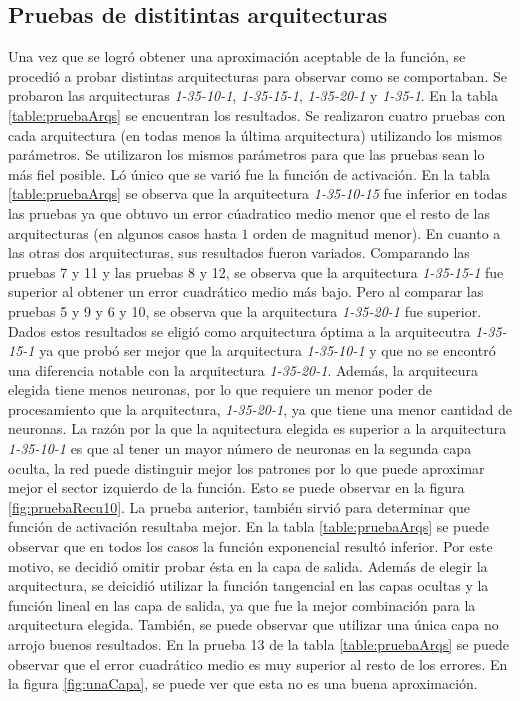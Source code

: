 \documentclass[11pt,a4paper]{article}
\begin{document}
\subsection{Pruebas de distitintas arquitecturas}


Una vez que se logró obtener una aproximación aceptable de la función, se procedió a probar distintas arquitecturas para observar como se comportaban. Se probaron las arquitecturas \emph{1-35-10-1}, \emph{1-35-15-1}, \emph{1-35-20-1} y \emph{1-35-1}. En la tabla \ref{table:pruebaArqs} se encuentran los resultados. Se realizaron cuatro pruebas con cada arquitectura (en todas menos la última arquitectura) utilizando los mismos parámetros. Se utilizaron los mismos parámetros para que las pruebas sean lo más fiel posible. Ló único que se varió fue la función de activación. En la tabla \ref{table:pruebaArqs} se observa que la arquitectura \emph{1-35-10-15} fue inferior en todas las pruebas ya que obtuvo un error cúadratico medio menor que el resto de las arquitecturas (en algunos casos hasta $1$ orden de magnitud menor). En cuanto a las otras dos arquitecturas, sus resultados fueron variados. Comparando las pruebas 7 y 11 y las pruebas 8 y 12, se observa que la arquitectura \emph{1-35-15-1} fue superior al obtener un error cuadrático medio más bajo. Pero al comparar las pruebas 5 y 9 y 6 y 10, se observa que la arquitectura \emph{1-35-20-1} fue superior. Dados estos resultados se eligió como arquitectura óptima a la arquitecutra \emph{1-35-15-1} ya que probó ser mejor que la arquitectura \emph{1-35-10-1} y que no se encontró una diferencia notable con la arquitectura \emph{1-35-20-1}. Además, la arquitecura elegida tiene menos neuronas, por lo que requiere un menor poder de procesamiento que la arquitectura, \emph{1-35-20-1}, ya que tiene una menor cantidad de neuronas. La razón por la que la aquitectura elegida es superior a la arquitectura \emph{1-35-10-1} es que al tener un mayor número de neuronas en la segunda capa oculta, la red puede distinguir mejor los patrones por lo que puede aproximar mejor el sector izquierdo de la función. Esto se puede observar en la figura \ref{fig:pruebaRecu10}. La prueba anterior, también sirvió para determinar que función de activación resultaba mejor. En la tabla \ref{table:pruebaArqs} se puede observar que en todos los casos la función exponencial resultó inferior. Por este motivo, se decidió omitir probar ésta en la capa de salida. Además de elegir la arquitectura, se deicidió utilizar la función tangencial en las capas ocultas y la función lineal en las capa de salida, ya que fue la mejor combinación para la arquitectura elegida. También, se puede observar que utilizar una única capa no arrojo buenos resultados. En la prueba 13 de la tabla \ref{table:pruebaArqs} se puede observar que el error cuadrático medio es muy superior al resto de los errores. En la figura \ref{fig:unaCapa}, se puede ver que esta no es una buena aproximación.
\end{document}
